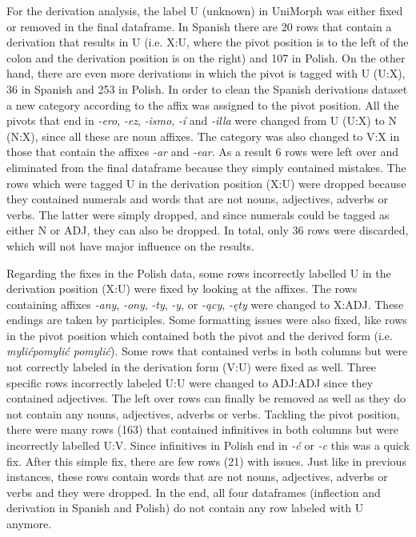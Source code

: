 \documentclass[12pt]{article}
\begin{document}
For the derivation analysis, the label U (unknown) in UniMorph was either fixed or removed in the final dataframe. In Spanish there are 20 rows that contain a derivation that results in U (i.e. X:U, where the pivot position is to the left of the colon and the derivation position is on the right) and 107 in Polish. On the other hand, there are even more derivations in which the pivot is tagged with U (U:X), 36 in Spanish and 253 in Polish.
In order to clean the Spanish derivations dataset a new category according to the affix was assigned to the pivot position. All the pivots that end in \textit{-ero}, \textit{-ez}, \textit{-ismo}, \textit{-í} and \textit{-illa} were changed from U (U:X) to N (N:X), since all these are noun affixes. The category was also changed to V:X in those that contain the affixes \textit{-ar} and \textit{-ear}. As a result 6 rows were left over and eliminated from the final dataframe because they simply contained mistakes. The rows which were tagged U in the derivation position (X:U) were dropped because they contained numerals and words that are not nouns, adjectives, adverbs or verbs. The latter were simply dropped, and since numerals could be tagged as either N or ADJ, they can also be dropped. In total, only 36 rows were discarded, which will not have major influence on the results.


Regarding the fixes in the Polish data, some rows incorrectly labelled U in the derivation position (X:U) were fixed by looking at the affixes. The rows containing affixes \textit{-any}, \textit{-ony}, \textit{-ty}, \textit{-y}, or \textit{-ący}, \textit{-ęty} were changed to X:ADJ. These endings are taken by participles. Some formatting issues were also fixed, like rows in the pivot position which contained both the pivot and the derived form (i.e. \textit{mylićpomylić pomylić}). Some rows that contained verbs in both columns but were not correctly labeled in the derivation form (V:U) were fixed as well. Three specific rows incorrectly labeled U:U were changed to ADJ:ADJ since they contained adjectives. %
The left over rows can finally be removed as well as they do not contain any nouns, adjectives, adverbs or verbs.
Tackling the pivot position, there were many rows (163) that contained infinitives in both columns but were incorrectly labelled U:V. Since infinitives in Polish end in \textit{-ć} or \textit{-c} this was a quick fix. After this simple fix, there are few rows (21) with issues. Just like in previous instances, these rows contain words that are not nouns, adjectives, adverbs or verbs and they were dropped. In the end, all four dataframes (inflection and derivation in Spanish and Polish) do not contain any row labeled with U anymore.
\end{document}
